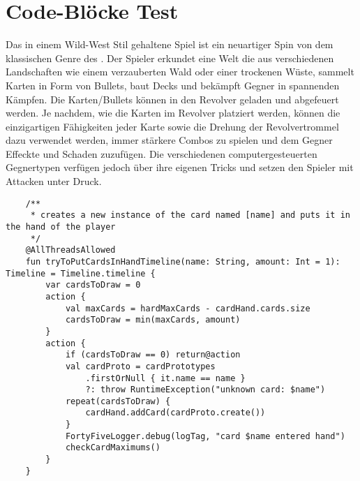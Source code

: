
\chapter{Code-Blöcke Test}\label{ch:code-blocke-test}

\renewcommand{\kapitelautor}{Autor: Marvin}

Das in einem Wild-West Stil gehaltene Spiel ist ein neuartiger Spin von dem klassischen Genre des .
Der Spieler erkundet eine Welt die aus verschiedenen Landschaften wie einem verzauberten Wald oder einer trockenen Wüste,
sammelt Karten in Form von Bullets, baut Decks und bekämpft Gegner in spannenden Kämpfen.
Die Karten/Bullets können in den Revolver geladen und abgefeuert werden.
Je nachdem, wie die Karten im Revolver platziert werden, können die einzigartigen Fähigkeiten jeder Karte sowie die
Drehung der Revolvertrommel dazu verwendet werden, immer stärkere Combos zu spielen und dem Gegner Effeckte und Schaden zuzufügen.
Die verschiedenen computergesteuerten Gegnertypen verfügen jedoch über ihre eigenen Tricks und setzen den Spieler mit Attacken unter Druck.

\begin{verbatim}
    /**
     * creates a new instance of the card named [name] and puts it in the hand of the player
     */
    @AllThreadsAllowed
    fun tryToPutCardsInHandTimeline(name: String, amount: Int = 1): Timeline = Timeline.timeline {
        var cardsToDraw = 0
        action {
            val maxCards = hardMaxCards - cardHand.cards.size
            cardsToDraw = min(maxCards, amount)
        }
        action {
            if (cardsToDraw == 0) return@action
            val cardProto = cardPrototypes
                .firstOrNull { it.name == name }
                ?: throw RuntimeException("unknown card: $name")
            repeat(cardsToDraw) {
                cardHand.addCard(cardProto.create())
            }
            FortyFiveLogger.debug(logTag, "card $name entered hand")
            checkCardMaximums()
        }
    }
\end{verbatim}

